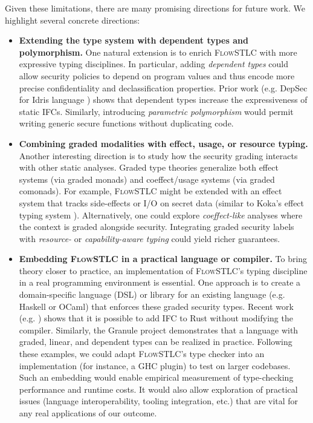 \documentclass[conference]{IEEEtran}
\begin{document}
Given these limitations, there are many promising directions for future work. We highlight several concrete directions:
\begin{itemize}
    \item \textbf{Extending the type system with dependent types and polymorphism.} One natural extension is to enrich \textsc{FlowSTLC} with more expressive typing disciplines. In particular, adding \emph{dependent types} could allow security policies to depend on program values and thus encode more precise confidentiality and declassification properties. Prior work (e.g. DepSec for Idris language \cite{gregersen2019dependently}) shows that dependent types increase the expressiveness of static IFCs. Similarly, introducing \emph{parametric polymorphism} would permit writing generic secure functions without duplicating code.
    \item \textbf{Combining graded modalities with effect, usage, or resource typing.} Another interesting direction is to study how the security grading interacts with other static analyses. Graded type theories generalize both effect systems (via graded monads) and coeffect/usage systems (via graded comonads). For example, \textsc{FlowSTLC} might be extended with an effect system that tracks side-effects or I/O on secret data (similar to Koka's effect typing system \cite{leijen2014koka} \cite{leijen2016algebraic}). Alternatively, one could explore \emph{coeffect-like} analyses where the context is graded alongside security. Integrating graded security labels with \emph{resource-} or \emph{capability-aware typing} could yield richer guarantees.
    \item \textbf{Embedding \textsc{FlowSTLC} in a practical language or compiler.} To bring theory closer to practice, an implementation of \textsc{FlowSTLC}'s typing discipline in a real programming environment is essential. One approach is to create a domain-specific language (DSL) or library for an existing language (e.g. Haskell or OCaml) that enforces these graded security types. Recent work (e.g. \cite{lamba2024cocoon}) shows that it is possible to add IFC to Rust without modifying the compiler. Similarly, the Granule project \cite{orchard2019quantitative} demonstrates that a language with graded, linear, and dependent types can be realized in practice. Following these examples, we could adapt \textsc{FlowSTLC}'s type checker into an implementation (for instance, a GHC plugin) to test on larger codebases. Such an embedding would enable empirical measurement of type-checking performance and runtime costs. It would also allow exploration of practical issues (language interoperability, tooling integration, etc.) that are vital for any real applications of our outcome.
\end{itemize}
\end{document}
